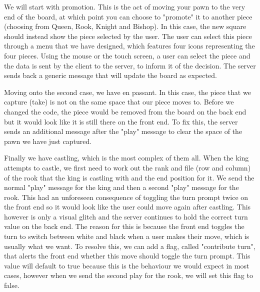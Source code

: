 We will start with promotion. This is the act of moving your pawn to the very end of the board, at which point you can choose to "promote" it to another piece (choosing from Queen, Rook, Knight and Bishop). In this case, the new square should instead show the piece selected by the user. The user can select this piece through a menu that we have designed, which features four icons representing the four pieces. Using the mouse or the touch screen, a user can select the piece and the data is sent by the client to the server, to inform it of the decision. The server sends back a generic message that will update the board as expected.

Moving onto the second case, we have en passant. In this case, the piece that we capture (take) is not on the same space that our piece moves to. Before we changed the code, the piece would be removed from the board on the back end but it would look like it is still there on the front end. To fix this, the server sends an additional message after the "play" message to clear the space of the pawn we have just captured.

Finally we have castling, which is the most complex of them all. When the king attempts to castle, we first need to work out the rank and file (row and column) of the rook that the king is castling with and the end position for it. We send the normal "play" message for the king and then a second "play" message for the rook. This had an unforeseen consequence of toggling the turn prompt twice on the front end so it would look like the user could move again after castling. This however is only a visual glitch and the server continues to hold the correct turn value on the back end. The reason for this is because the front end toggles the turn to switch between white and black when a user makes their move, which is usually what we want. To resolve this, we can add a flag, called "contribute turn", that alerts the front end whether this move should toggle the turn prompt. This value will default to true because this is the behaviour we would expect in most cases, however when we send the second play for the rook, we will set this flag to false.

